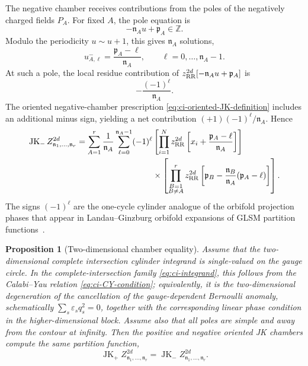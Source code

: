 \documentclass[11pt,a4paper]{article}
\numberwithin{equation}{section}
\theoremstyle{plain}
\newtheorem{proposition}[theorem]{Proposition}
\theoremstyle{definition}
\theoremstyle{remark}
\begin{document}
The negative chamber receives contributions from the poles of the negatively charged fields \(P_A\). For fixed \(A\), the pole equation is
\begin{equation}
-\mathfrak n_Au+\mathfrak p_A\in\mathbb Z.
\end{equation}
Modulo the periodicity \(u\sim u+1\), this gives \(\mathfrak n_A\) solutions,
\begin{equation}
u_{A,\ell}^{-}=\frac{\mathfrak p_A-\ell}{\mathfrak n_A},
\qquad
\ell=0,\ldots,\mathfrak n_A-1.
\end{equation}
At such a pole, the local residue contribution of \(z_{\rm RR}^{2d}[-\mathfrak n_Au+\mathfrak p_A]\) is
\begin{equation}
-\frac{(-1)^{\ell}}{\mathfrak n_A}.
\end{equation}
The oriented negative-chamber prescription \eqref{eq:ci-oriented-JK-definition} includes an additional minus sign, yielding a net contribution \((+1)(-1)^\ell/\mathfrak n_A\). Hence
\begin{equation}
\begin{aligned}
\operatorname{JK}_{-}
Z_{\mathfrak n_1,\ldots,\mathfrak n_r}^{2d}
=
\sum_{A=1}^{r}\frac{1}{\mathfrak n_A}
\sum_{\ell=0}^{\mathfrak n_A-1}(-1)^{\ell}
&
\left[
\prod_{i=1}^{N}
z_{\rm RR}^{2d}
\left[
x_i+\frac{\mathfrak p_A-\ell}{\mathfrak n_A}
\right]
\right]
\\
&\times
\left[
\prod_{\substack{B=1\\ B\neq A}}^{r}
z_{\rm RR}^{2d}
\left[
\mathfrak p_B-\frac{\mathfrak n_B}{\mathfrak n_A}(\mathfrak p_A-\ell)
\right]
\right].
\end{aligned}
\label{eq:ci-JK-minus}
\end{equation}
The signs \((-1)^\ell\) are the one-cycle cylinder analogue of the orbifold projection phases that appear in Landau--Ginzburg orbifold expansions of GLSM partition functions~\cite{Witten:1993yc}.

\begin{proposition}[Two-dimensional chamber equality]
\label{prop:ci-two-dimensional-chamber-equality}
Assume that the two-dimensional complete intersection cylinder integrand is single-valued on the gauge circle.  In the complete-intersection family \eqref{eq:ci-integrand}, this follows from the Calabi--Yau relation \eqref{eq:ci-CY-condition}; equivalently, it is the two-dimensional degeneration of the cancellation of the gauge-dependent Bernoulli anomaly, schematically \(\sum_s\varepsilon_s q_s^2=0\), together with the corresponding linear phase condition in the higher-dimensional block.  Assume also that all poles are simple and away from the contour at infinity.  Then the positive and negative oriented JK chambers compute the same partition function,
\begin{equation}
\operatorname{JK}_{+}Z_{\mathfrak n_1,\ldots,\mathfrak n_r}^{2d}
=
\operatorname{JK}_{-}Z_{\mathfrak n_1,\ldots,\mathfrak n_r}^{2d}.
\label{eq:ci-chamber-duality}
\end{equation}
\end{proposition}
\end{document}
